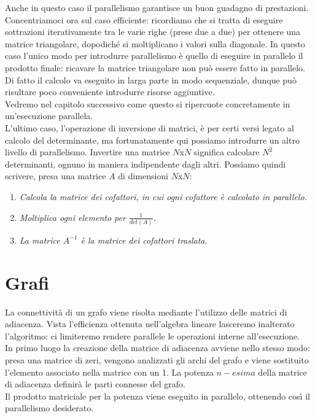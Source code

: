 Anche in questo caso il parallelismo garantisce un buon guadagno di prestazioni. Concentriamoci ora sul caso efficiente: ricordiamo che si tratta di eseguire sottrazioni iterativamente tra le varie righe (prese due a due) per ottenere una matrice triangolare, dopodiché si moltiplicano i valori sulla diagonale. In questo caso l'unico modo per introdurre parallelismo è quello di eseguire in parallelo il prodotto finale: ricavare la matrice triangolare non può essere fatto in parallelo. Di fatto il calcolo va eseguito in larga parte in modo sequenziale, dunque può risultare poco conveniente introdurre risorse aggiuntive.\\
Vedremo nel capitolo successivo come questo si ripercuote concretamente in un'esecuzione parallela.\\
L'ultimo caso, l'operazione di inversione di matrici, è per certi versi legato al calcolo del determinante, ma fortunatamente qui possiamo introdurre un altro livello di parallelismo. Invertire una matrice $N$x$N$ significa calcolare $N^2$ determinanti, ognuno in maniera indipendente dagli altri. Possiamo quindi scrivere, presa una matrice $A$ di dimensioni $N$x$N$:
\begin{enumerate}
\item{\textit{Calcola la matrice dei cofattori, in cui ogni cofattore è calcolato in parallelo.}}
\item{\textit{Moltiplica ogni elemento per $\frac{1}{det(A)}$.}}
\item{\textit{La matrice $A^{-1}$ è la matrice dei cofattori traslata.}}
\end{enumerate}
\section{Grafi}
La connettività di un grafo viene risolta mediante l'utilizzo delle matrici di adiacenza. Vista l'efficienza ottenuta nell'algebra lineare lasceremo inalterato l'algoritmo: ci limiteremo rendere parallele le operazioni interne all'esecuzione.\\
In primo luogo la creazione della matrice di adiacenza avviene nello stesso modo: presa una matrice di zeri, vengono analizzati gli archi del grafo e viene sostituito l'elemento associato nella matrice con un 1. La potenza $n-esima$ della matrice di adiacenza definirà le parti connesse del grafo.\\
Il prodotto matriciale per la potenza viene eseguito in parallelo, ottenendo così il parallelismo desiderato.
